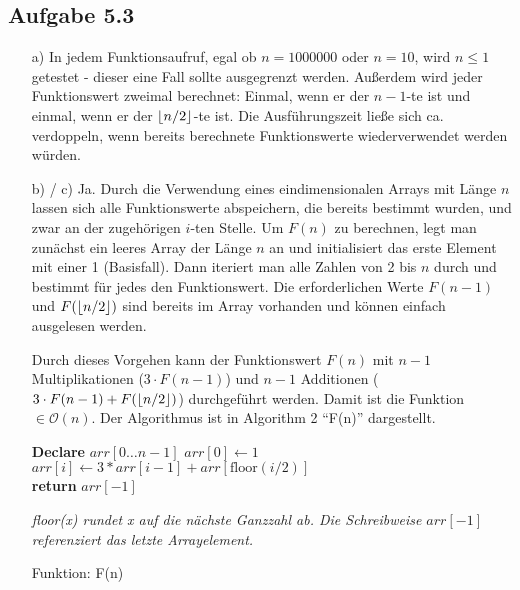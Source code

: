 \documentclass{article}
\DeclarePairedDelimiter\floor{\lfloor}{\rfloor}
\begin{document}
    \subsection*{Aufgabe 5.3}
    \begin{enumerate}
        \item[a)] In jedem Funktionsaufruf, egal ob $n=1000000$ oder $n=10$, wird $n\le 1$ getestet - dieser eine Fall sollte ausgegrenzt werden. Außerdem wird jeder Funktionswert zweimal berechnet: Einmal, wenn er der $n-1$-te ist und einmal, wenn er der $\floor{n/2}$-te ist. Die Ausführungszeit ließe sich ca. verdoppeln, wenn bereits berechnete Funktionswerte wiederverwendet werden würden. 
        \item[b) / c)] Ja. Durch die Verwendung eines eindimensionalen Arrays mit Länge $n$ lassen sich alle Funktionswerte abspeichern, die bereits bestimmt wurden, und zwar an der zugehörigen $i$-ten Stelle. Um $F(n)$ zu berechnen, legt man zunächst ein leeres Array der Länge $n$ an und initialisiert das erste Element mit einer 1 (Basisfall). Dann iteriert man alle Zahlen von 2 bis $n$ durch und bestimmt für jedes den Funktionswert. Die erforderlichen Werte $F(n-1)$ und $F(\floor{n/2})$ sind bereits im Array vorhanden und können einfach ausgelesen werden. 
        
        Durch dieses Vorgehen kann der Funktionswert $F(n)$ mit $n-1$ Multiplikationen ($3\cdot F(n-1)$) und $n-1$ Additionen ($3\cdot F(n-1) + F(\floor{n/2})$) durchgeführt werden. Damit ist die Funktion $\in \mathcal{O}(n)$. Der Algorithmus ist in Algorithm 2 "`F(n)"' dargestellt. 

        \begin{algorithm}[h]
            \begin{algorithmic}[1]
                \State \textbf{Declare} $arr[0 \ldots n-1]$
                \State $arr[0] \gets 1$
                    \State $arr[i] \gets 3* arr[i-1] + arr[\text{floor}(i/2)]$
                \EndFor
                \\
                \State \textbf{return} $arr[-1]$
                \EndProcedure
                \end{algorithmic}
                \textit{floor(x) rundet x auf die nächste Ganzzahl ab. Die Schreibweise $arr[-1]$ referenziert das letzte Arrayelement.}
                \caption{Funktion: F(n)}
        \end{algorithm}
    \end{enumerate}
\end{document}
